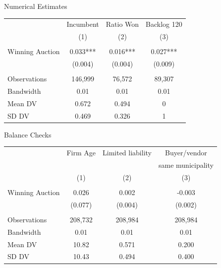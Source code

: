 \documentclass[aspectratio=169]{beamer}
\begin{document}

\begin{frame}{Numerical Estimates}
\begin{center}
\begin{tabular}{lccc}
\hline\hline
 & Incumbent & Ratio Won & Backlog 120 \\
 & (1) & (2) & (3) \\
\hline
\\[-4pt]
Winning Auction & 0.033*** & 0.016*** & 0.027*** \\
 & (0.004) & (0.004) & (0.009) \\
\\[-4pt]
Observations & 146{,}999 & 76{,}572 & 89{,}307 \\
Bandwidth & 0.01 & 0.01 & 0.01 \\
Mean DV & 0.672 & 0.494 & 0 \\
SD DV   & 0.469 & 0.326 & 1 \\
\hline\hline
\end{tabular}
\end{center}
\end{frame}


\begin{frame}{Balance Checks}
\begin{center}
\begin{tabular}{lccc}
\hline\hline
 & Firm Age & Limited liability & Buyer/vendor \\
 &          &                   & same municipality \\
 & (1) & (2) & (3) \\
\hline
\\[-4pt]
Winning Auction   & 0.026 & 0.002 & -0.003 \\
                  & (0.077) & (0.004) & (0.002) \\
\\[-4pt]
Observations & 208{,}732 & 208{,}984 & 208{,}984 \\
Bandwidth    & 0.01 & 0.01 & 0.01 \\
Mean DV      & 10.82 & 0.571 & 0.200 \\
SD DV        & 10.43 & 0.494 & 0.400 \\
\hline\hline
\end{tabular}
\end{center}
\end{frame}
\end{document}
